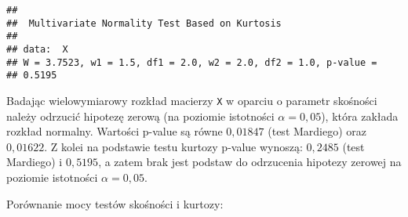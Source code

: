 \documentclass[polish,]{book}
\newenvironment{Shaded}{\begin{snugshade}}{\end{snugshade}}
\newcommand{\ControlFlowTok}[1]{\textcolor[rgb]{0.13,0.29,0.53}{\textbf{#1}}}
\newcommand{\DataTypeTok}[1]{\textcolor[rgb]{0.13,0.29,0.53}{#1}}
\newcommand{\DecValTok}[1]{\textcolor[rgb]{0.00,0.00,0.81}{#1}}
\newcommand{\FloatTok}[1]{\textcolor[rgb]{0.00,0.00,0.81}{#1}}
\newcommand{\KeywordTok}[1]{\textcolor[rgb]{0.13,0.29,0.53}{\textbf{#1}}}
\newcommand{\NormalTok}[1]{#1}
\newcommand{\OperatorTok}[1]{\textcolor[rgb]{0.81,0.36,0.00}{\textbf{#1}}}
\newcommand{\OtherTok}[1]{\textcolor[rgb]{0.56,0.35,0.01}{#1}}
\newcommand{\StringTok}[1]{\textcolor[rgb]{0.31,0.60,0.02}{#1}}
\begin{document}
\begin{verbatim}
## 
##  Multivariate Normality Test Based on Kurtosis
## 
## data:  X
## W = 3.7523, w1 = 1.5, df1 = 2.0, w2 = 2.0, df2 = 1.0, p-value =
## 0.5195
\end{verbatim}

Badając wielowymiarowy rozkład macierzy \texttt{X} w oparciu o parametr skośności należy
odrzucić hipotezę zerową (na poziomie istotności \(\alpha = 0,05\)), która zakłada rozkład
normalny. Wartości p-value są równe \(0,01847\) (test Mardiego) oraz \(0,01622\). Z kolei
na podstawie testu kurtozy p-value wynoszą: \(0,2485\) (test Mardiego) i \(0,5195\), a zatem
brak jest podstaw do odrzucenia hipotezy zerowej na poziomie istotności \(\alpha = 0,05\).

Porównanie mocy testów skośności i kurtozy:

\begin{Shaded}
\end{Shaded}
\end{document}
